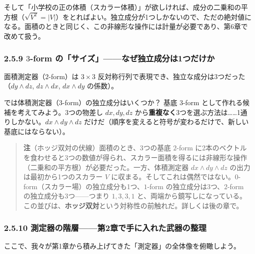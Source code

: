 \documentclass[a4paper,12pt,openany]{book}
\begin{document}
そして「小学校の正の体積（スカラー体積）」が欲しければ、成分の二乗和の平方根（\(\sqrt{V^2} = |V|\)）をとればよい。独立成分が1つしかないので、ただの絶対値になる。面積のときと同じく、この非線形な操作には計量が必要であり、第6章で改めて扱う。

\hypertarget{form-ux306eux30b5ux30a4ux30baux306aux305cux72ecux7acbux6210ux5206ux306f1ux3064ux3060ux3051ux304b}{%
\subsubsection{\texorpdfstring{2.5.9 \(3\)-form
の「サイズ」——なぜ独立成分は1つだけか}{2.5.9 3-form の「サイズ」——なぜ独立成分は1つだけか}}\label{form-ux306eux30b5ux30a4ux30baux306aux305cux72ecux7acbux6210ux5206ux306f1ux3064ux3060ux3051ux304b}}

面積測定器（\(2\)-form）は \(3 \times 3\)
反対称行列で表現でき、独立な成分は3つだった（\(dy \wedge dz\),
\(dz \wedge dx\), \(dx \wedge dy\) の係数）。

では体積測定器（\(3\)-form）の独立成分はいくつか？ 基底 \(3\)-form
として作れる候補を考えてみよう。3つの物差し \(dx, dy, dz\)
から\textbf{重複なく}3つを選ぶ方法は\ldots\ldots1通りしかない。\(dx \wedge dy \wedge dz\)
だけだ（順序を変えると符号が変わるだけで、新しい基底にはならない）。

\begin{quote}
\textbf{注}（ホッジ双対の伏線）面積のとき、3つの基底 \(2\)-form
に2本のベクトルを食わせると3つの数値が得られ、スカラー面積を得るには非線形な操作（二乗和の平方根）が必要だった。一方、体積測定器
\(dx \wedge dy \wedge dz\) の出力は最初から1つのスカラー \(V\)
に収まる。そしてこれは偶然ではない。\(0\)-form（スカラー場）の独立成分も1つ、\(1\)-form
の独立成分は3つ、\(2\)-form の独立成分も3つ——つまり \(1, 3, 3, 1\)
と、両端から鏡写しになっている。この並びは、\textbf{ホッジ双対}という対称性の前触れだ。詳しくは後の章で。
\end{quote}

\hypertarget{ux6e2cux5b9aux5668ux306eux968eux5c64ux7b2c2ux7ae0ux3067ux624bux306bux5165ux308cux305fux6b66ux5668ux306eux6574ux7406}{%
\subsubsection{2.5.10
測定器の階層——第2章で手に入れた武器の整理}\label{ux6e2cux5b9aux5668ux306eux968eux5c64ux7b2c2ux7ae0ux3067ux624bux306bux5165ux308cux305fux6b66ux5668ux306eux6574ux7406}}

ここで、我々が第1章から積み上げてきた「測定器」の全体像を俯瞰しよう。
\end{document}
